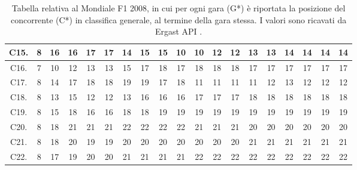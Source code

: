 \documentclass[12pt,a4paper,openright,twoside]{book}
\begin{document}
\begin{table}[H]
{\begin{tabular}{|c|c|c|c|c|c|c|c|c|c|c|c|c|c|c|c|c|c|c|}
    C15.  & 8 & 16 & 16 & 17 & 17 & 14 & 15 & 15 & 10 & 10 & 12 & 12 & 13 & 13 & 14 & 14 & 14 & 14 \\ \hline
    C16.  & 7 & 10 & 12 & 13 & 13 & 15 & 17 & 18 & 17 & 18 & 18 & 18 & 17 & 17 & 17 & 17 & 17 & 17 \\ \hline
    C17.  & 8 & 14 & 17 & 18 & 18 & 19 & 19 & 17 & 18 & 11 & 11 & 11 & 11 & 12 & 13 & 12 & 12 & 12 \\ \hline
    C18.    & 8 & 13 & 15 & 12 & 12 & 13 & 16 & 16 & 16 & 17 & 17 & 17 & 18 & 18 & 18 & 18 & 18 & 18 \\ \hline
    C19.  & 8 & 15 & 18 & 16 & 16 & 18 & 18 & 19 & 19 & 19 & 19 & 19 & 19 & 19 & 19 & 19 & 19 & 19 \\ \hline
    C20. & 8 & 18 & 21 & 21 & 21 & 22 & 22 & 22 & 22 & 21 & 21 & 21 & 20 & 20 & 20 & 20 & 20 & 20 \\ \hline
    C21. & 8 & 18 & 20 & 19 & 19 & 20 & 20 & 20 & 20 & 20 & 20 & 20 & 21 & 21 & 21 & 21 & 21 & 21 \\ \hline
    C22.  & 8 & 17 & 19 & 20 & 20 & 21 & 21 & 21 & 21 & 22 & 22 & 22 & 22 & 22 & 22 & 22 & 22 & 22 \\ \hline
    \end{tabular}}
    \endgroup
    
    \caption{Tabella relativa al Mondiale F1 2008, in cui per ogni gara (G*)  è riportata la posizione del concorrente (C*) in classifica generale, al termine della gara stessa.
    I valori sono ricavati da Ergast API .}
    \label{table:classifichegeneralireali2008tabella}
\end{table}
\end{document}
